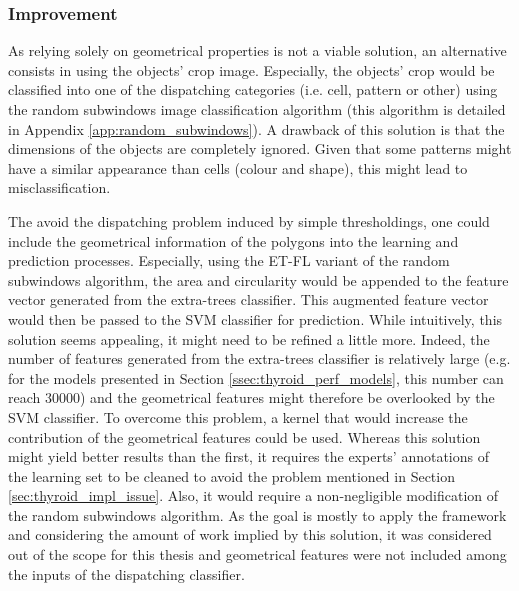 \subsubsection{Improvement}

As relying solely on geometrical properties is not a viable solution, an alternative consists in using the objects' crop image. Especially, the objects' crop would be classified into one of the dispatching categories (i.e. cell, pattern or other) using the random subwindows image classification algorithm \cite{Maree201617} (this algorithm is detailed in Appendix \ref{app:random_subwindows}). A drawback of this solution is that the dimensions of the objects are completely ignored. Given that some patterns might have a similar appearance than cells (colour and shape), this might lead to misclassification. 

The avoid the dispatching problem induced by simple thresholdings, one could include the geometrical information of the polygons into the learning and prediction processes. Especially, using the ET-FL variant of the random subwindows algorithm, the area and circularity would be appended to the feature vector generated from the extra-trees classifier. This augmented feature vector would then be passed to the SVM classifier for prediction. While intuitively, this solution seems appealing, it might need to be refined a little more. Indeed, the number of features generated from the extra-trees classifier is relatively large (e.g. for the models presented in Section \ref{ssec:thyroid_perf_models}, this number can reach 30000) and the geometrical features might therefore be overlooked by the SVM classifier. To overcome this problem, a kernel that would increase the contribution of the geometrical features could be used. Whereas this solution might yield better results than the first, it requires the experts' annotations of the learning set to be cleaned to avoid the problem mentioned in Section \ref{sec:thyroid_impl_issue}. Also, it would require a non-negligible modification of the random subwindows algorithm. As the goal is mostly to apply the framework and considering the amount of work implied by this solution, it was considered out of the scope for this thesis and geometrical features were not included among the inputs of the dispatching classifier.

